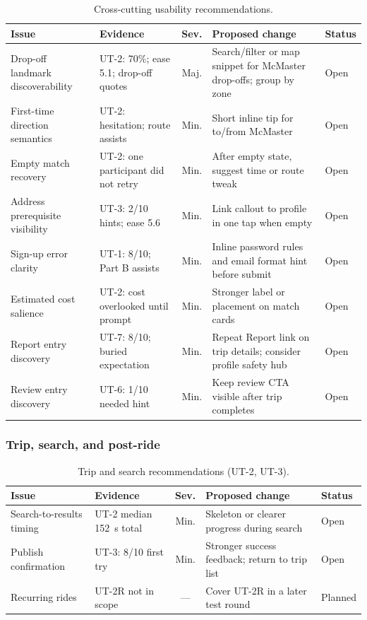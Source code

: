 \begin{table}[H]
  \centering
  \footnotesize
  \setlength{\tabcolsep}{3pt}
  \begin{tabularx}{\textwidth}{X X c X X}
    \toprule
    \textbf{Issue} & \textbf{Evidence} & \textbf{Sev.} & \textbf{Proposed change} & \textbf{Status}\\
    \midrule
    Drop-off landmark discoverability & UT-2: 70\%; ease 5.1; drop-off quotes & Maj. & Search/filter or map snippet for McMaster drop-offs; group by zone & Open\\
    First-time direction semantics & UT-2: hesitation; route assists & Min. & Short inline tip for to/from McMaster & Open\\
    Empty match recovery & UT-2: one participant did not retry & Min. & After empty state, suggest time or route tweak & Open\\
    Address prerequisite visibility & UT-3: 2/10 hints; ease 5.6 & Min. & Link callout to profile in one tap when empty & Open\\
    Sign-up error clarity & UT-1: 8/10; Part B assists & Min. & Inline password rules and email format hint before submit & Open\\
    Estimated cost salience & UT-2: cost overlooked until prompt & Min. & Stronger label or placement on match cards & Open\\
    Report entry discovery & UT-7: 8/10; buried expectation & Min. & Repeat Report link on trip details; consider profile safety hub & Open\\
    Review entry discovery & UT-6: 1/10 needed hint & Min. & Keep review CTA visible after trip completes & Open\\
    \bottomrule
  \end{tabularx}
  \caption{Cross-cutting usability recommendations.}
  \label{tab:rec_general}
\end{table}

\subsubsection{Trip, search, and post-ride}

\begin{table}[H]
  \centering
  \footnotesize
  \setlength{\tabcolsep}{3pt}
  \begin{tabularx}{\textwidth}{X X c X X}
    \toprule
    \textbf{Issue} & \textbf{Evidence} & \textbf{Sev.} & \textbf{Proposed change} & \textbf{Status}\\
    \midrule
    Search-to-results timing & UT-2 median 152~s total & Min. & Skeleton or clearer progress during search & Open\\
    Publish confirmation & UT-3: 8/10 first try & Min. & Stronger success feedback; return to trip list & Open\\
    Recurring rides & UT-2R not in scope & --- & Cover UT-2R in a later test round & Planned\\
    \bottomrule
  \end{tabularx}
  \caption{Trip and search recommendations (UT-2, UT-3).}
  \label{tab:rec_trips}
\end{table}

